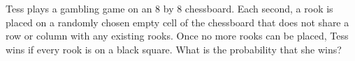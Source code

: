 Tess plays a gambling game on an $8$ by $8$ chessboard. Each second, a rook is placed on a randomly chosen empty cell of the chessboard that does not share a row or column with any existing rooks. Once no more rooks can be placed, Tess wins if every rook is on a black square. What is the probability that she wins?
